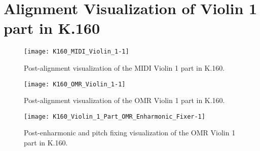 \chapter{Alignment Visualization of Violin 1 part in K.160}\label{appb}

\clearpage

\begin{figure}[H]
\centering
\texttt{[image: K160\_MIDI\_Violin\_1-1]}
\caption{Post-alignment visualization of the MIDI Violin 1 part in K.160.}
\label{fig:k160postalignv1midi}
\end{figure}

\begin{figure}[H]
\centering
\texttt{[image: K160\_OMR\_Violin\_1-1]}
\caption{Post-alignment visualization of the OMR Violin 1 part in K.160.}
\label{fig:k160postalignv1omr}
\end{figure}

\begin{figure}[H]
\centering
\texttt{[image: K160\_Violin\_1\_Part\_OMR\_Enharmonic\_Fixer-1]}
\caption{Post-enharmonic and pitch fixing visualization of the OMR Violin 1 part in K.160.}
\label{fig:k160postfixv1}
\end{figure}

\clearpage
\newpage

